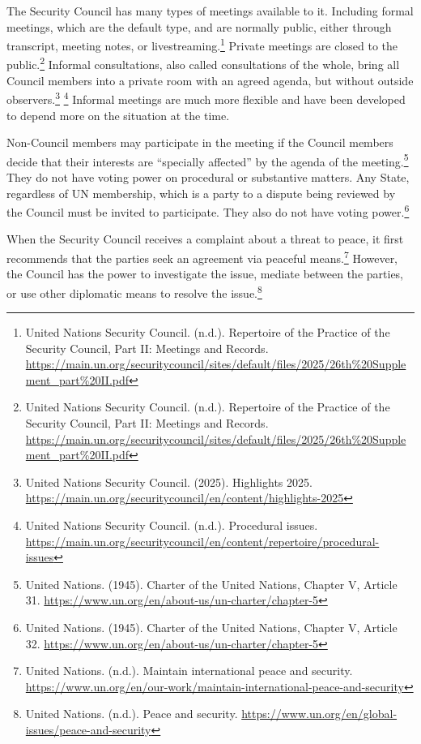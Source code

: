 The Security Council has many types of meetings available to it. Including formal meetings, which are the default type, and are normally public, either through transcript, meeting notes, or livestreaming.\footnote{United Nations Security Council. (n.d.). Repertoire of the Practice of the Security Council, Part II: Meetings and Records. \url{https://main.un.org/securitycouncil/sites/default/files/2025/26th\%20Supplement_part\%20II.pdf}} Private meetings are closed to the public.\footnote{United Nations Security Council. (n.d.). Repertoire of the Practice of the Security Council, Part II: Meetings and Records. \url{https://main.un.org/securitycouncil/sites/default/files/2025/26th\%20Supplement_part\%20II.pdf}} Informal consultations, also called consultations of the whole, bring all Council members into a private room with an agreed agenda, but without outside observers.\footnote{United Nations Security Council. (2025). Highlights 2025. \url{https://main.un.org/securitycouncil/en/content/highlights-2025}} \footnote{United Nations Security Council. (n.d.). Procedural issues. \url{https://main.un.org/securitycouncil/en/content/repertoire/procedural-issues}} Informal meetings are much more flexible and have been developed to depend more on the situation at the time.

Non-Council members may participate in the meeting if the Council members decide that their interests are “specially affected” by the agenda of the meeting.\footnote{United Nations. (1945). Charter of the United Nations, Chapter V, Article 31. \url{https://www.un.org/en/about-us/un-charter/chapter-5}} They do not have voting power on procedural or substantive matters. Any State, regardless of UN membership, which is a party to a dispute being reviewed by the Council must be invited to participate. They also do not have voting power.\footnote{United Nations. (1945). Charter of the United Nations, Chapter V, Article 32. \url{https://www.un.org/en/about-us/un-charter/chapter-5}}

When the Security Council receives a complaint about a threat to peace, it first recommends that the parties seek an agreement via peaceful means.\footnote{United Nations. (n.d.). Maintain international peace and security. \url{https://www.un.org/en/our-work/maintain-international-peace-and-security}} However, the Council has the power to investigate the issue, mediate between the parties, or use other diplomatic means to resolve the issue.\footnote{United Nations. (n.d.). Peace and security. \url{https://www.un.org/en/global-issues/peace-and-security}}


